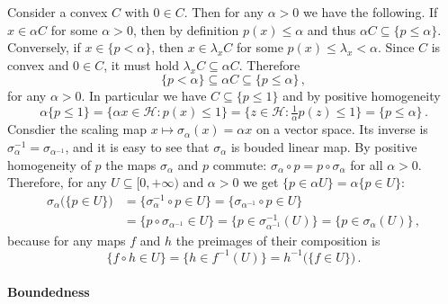 \documentclass[a4paper]{article}
\newcommand{\Hcal}{\mathcal{H}}
\begin{document}
Consider a convex $C$ with $0\in C$. Then for any $\alpha > 0$ we have the following.
If $x \in \alpha C$ for some $\alpha > 0$, then by definition $p(x) \leq \alpha$ and
thus $\alpha C \subseteq \{p \leq \alpha\}$. Conversely, if $x\in \{p < \alpha\}$,
then $x \in \lambda_x C$ for some $p(x) \leq \lambda_x < \alpha$. Since $C$ is convex
and $0\in C$, it must hold $\lambda_x C \subseteq \alpha C$. Therefore
\begin{equation*}
  \{p < \alpha \}
    \subseteq \alpha C
    \subseteq \{p \leq \alpha \}
    \,,
\end{equation*}
for any $\alpha > 0$. In particular we have $C \subseteq \{p \leq 1\}$ and by positive
homogeneity
\begin{equation*}
  \alpha \{p\leq 1\}
    = \{\alpha x \in \Hcal \colon p(x) \leq 1\}
    = \bigl\{z \in \Hcal \colon \tfrac1{\alpha} p(z) \leq 1\bigr\}
    = \{p \leq \alpha\}
    \,.
\end{equation*}
Consdier the scaling map $x\mapsto \sigma_\alpha(x) = \alpha x$ on a vector space.
Its inverse is $\sigma_\alpha^{-1} = \sigma_{\alpha^{-1}}$, and it is easy to see
that $\sigma_\alpha$ is bouded linear map. By positive homogeneity of $p$ the maps
$\sigma_\alpha$ and $p$ commute: $\sigma_\alpha \circ p = p \circ \sigma_\alpha$
for all $\alpha > 0$. Therefore, for any $U \subseteq [0, +\infty)$ and $\alpha > 0$
we get $\{p\in \alpha U\} = \alpha \{ p\in U \}$:
\begin{align*}
    \sigma_\alpha \bigl( \{p \in U\} \bigr)
    &= \bigl\{\sigma_\alpha^{-1} \circ p \in U\bigr\}
    = \bigl\{\sigma_{\alpha^{-1}} \circ p \in U\bigr\}
    \\
    &= \bigl\{p \circ \sigma_{\alpha^{-1}} \in U\bigr\}
    = \bigl\{p \in \sigma_{\alpha^{-1}}^{-1}(U)\bigr\}
    = \bigl\{p \in \sigma_\alpha(U)\bigr\}
    \,,
\end{align*}
because for any maps $f$ and $h$ the preimages of their composition is
\begin{equation*}
  \{f\circ h \in U\}
    = \bigl\{ h \in f^{-1}(U) \bigr\}
    = h^{-1}\bigl(\{f \in U \}\bigr)
    \,.
\end{equation*}


\paragraph{Boundedness} %
\label{par:boundedness}
\end{document}
